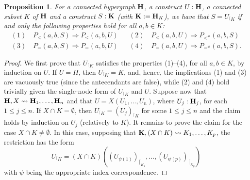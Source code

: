 \documentclass{article}
\theoremstyle{plain}
\newtheorem{proposition}[thm]{Proposition}
\theoremstyle{definition}
\newcommand{\inter}{\cap}
\newcommand{\hyper}[1]{{\bf #1}}
\newcommand{\restrconstr}[2]{{#1}_{{}^\lceil {#2}}}
\begin{document}
\begin{proposition} \label{characterisation-restriction}
For a connected hypergraph $\hyper{H}$, a construct $U:\hyper{H}$,  a connected subset $K$ of $\hyper{H}$ and a construct $S:\hyper{K}$ (with $\hyper{K}:={\bf H}_K$),
we have that $S=\restrconstr{U}{K}$ if and only  the following properties hold for all $a,b\in K$:
$$\begin{array}{lll}
(1)\quad P_<(a,b,S) \Rightarrow P_<(a,b,U) && (2)\quad  P_<(a,b,U) \Rightarrow P_{<^\#}(a,b,S) \\
(3) \quad P_=(a,b,S) \Rightarrow P_=(a,b,U)  && (4)\quad  P_=(a,b,U) \Rightarrow P_{=^\#}(a,b,S).
\end{array}$$
\end{proposition}
\begin{proof} 
We first prove that $\restrconstr{U}{K}$ satisfies the properties (1)--(4), for all $a,b\in K$, by induction on $U$. If $U=H$, then $\restrconstr{U}{K}=K$, and, hence, the implications (1) and (3) are vacuously true (since the antecendants are false), while (2) and (4)   hold trivially given the single-node form of $\restrconstr{U}{K}$ and $U$. Suppose now that ${\bf H},X\leadsto {\bf H}_1,\dots,{\bf H}_n$ and that  $U=X(U_1,\dots,U_n)$, where $U_j:{\bf H}_j$, for each $1\leq j\leq n$. If $X\cap K=\emptyset$, then $\restrconstr{U}{K}=\restrconstr{(U_j)}{K}$ for some $1\leq j\leq n$ and the claim holds by induction on $U_j$ (relatively to $K$).  It remains to prove the claim for the case
$X\cap K\neq \emptyset$. In this case, supposing that ${\bf K},(X\inter K)\leadsto K_1,\dots,K_p$, the restriction has the form 
\begin{equation}
\restrconstr{U}{K}=(X\cap K)((U_{\psi(1)})_{\lceil_{K_1}},\dots,(U_{\psi(p)})_{\lceil_{K_p}})\tag{$\dagger$}\label{UUU}\end{equation}
 with $\psi$ being the appropriate index correspondence.   


\end{proof}
\end{document}
